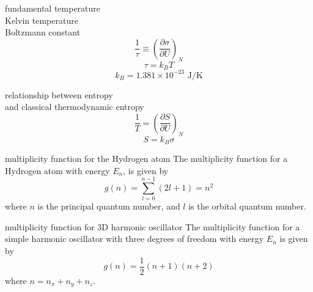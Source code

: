 \documentclass[avery5371,grid]{flashcards}
\begin{document}
\begin{flashcard}[Definition]{fundamental temperature\\Kelvin temperature\\Boltzmann constant}
\begin{equation*}
\dfrac{1}{\tau} \equiv
\left( \dfrac{\partial \sigma}{\partial U} \right)_{\!\!\! N}
\end{equation*}
\bigskip
\begin{equation*}
\tau = k_B T
\end{equation*}
\medskip
\begin{equation*}
k_B = 1.381 \times 10^{-23} \text{ J/K}
\end{equation*}
\end{flashcard}

\begin{flashcard}[Definition]{relationship between entropy\\and classical thermodynamic entropy}
\begin{equation*}
\dfrac{1}{T} = \left( \dfrac{\partial S}{\partial U} \right)_{\!\!\! N}
\end{equation*}
\bigskip
\begin{equation*}
S = k_B \sigma
\end{equation*}
\end{flashcard}

\begin{flashcard}[Equation]{multiplicity function for the Hydrogen atom}
The multiplicity function for a Hydrogen atom with
energy $E_n$, is given by
\begin{equation*}
g(n) = \sum_{l=0}^{n-1} (2l+1)  = n^2
\end{equation*}
where $n$ is the principal quantum number, and $l$ is the orbital quantum
number.
\end{flashcard}

\begin{flashcard}[Equation]{multiplicity function for 3D harmonic oscillator}
The multiplicity function for a simple harmonic oscillator with three
degrees of freedom with energy $E_n$ is given by
\begin{equation*}
g(n) = \dfrac{1}{2}(n+1)(n+2)
\end{equation*}
where $n = n_x + n_y + n_z$.
\end{flashcard}
\end{document}
